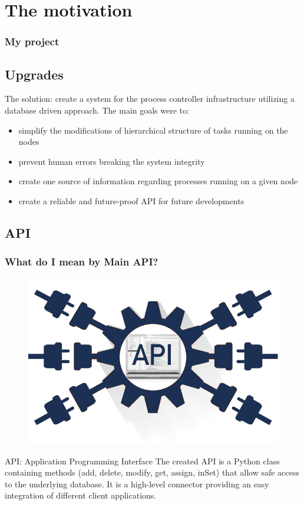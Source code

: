 \documentclass{beamer}
\begin{document}
\section{The motivation}
\begin{frame}
\frametitle{My project}
\subsection{Upgrades}
\begin{block}{The solution: create a system for the process controller infrastructure utilizing a database driven approach. The main goals were to:}
\begin{itemize}
\item simplify the modifications of hierarchical structure of tasks running on the nodes
\item prevent human errors breaking the system integrity
\item create one source of information regarding processes running on a given node
\item create a reliable and future-proof API for future developments
\end{itemize}
\end{block}
\end{frame}


\begin{frame}
\subsection{API}
\frametitle{What do I mean by Main API?}
\begin{figure}[H]
	\centering
    \includegraphics[scale=0.22]{images/api.png}
\end{figure}
\begin{block}{API: Application Programming Interface}
The created API is a Python class containing methods (add, delete, modify, get, assign, inSet) that allow safe access to the underlying database. It is a high-level connector providing an easy integration of different client applications.
\end{block}

\end{frame}
\end{document}
